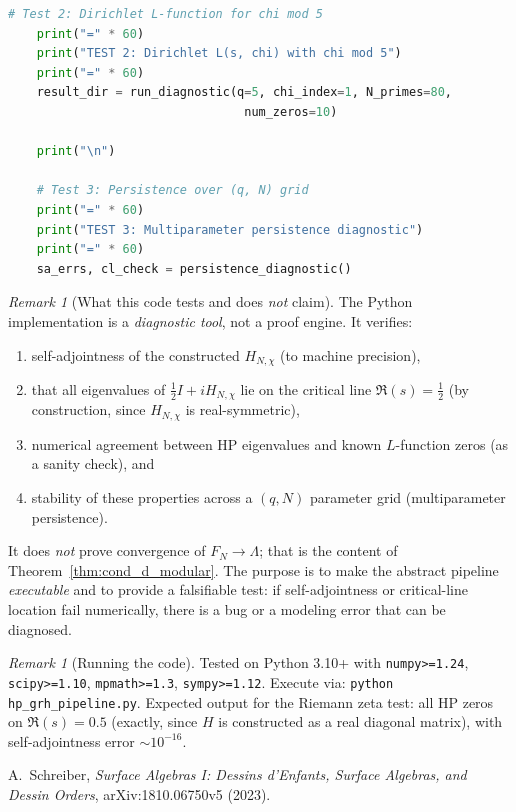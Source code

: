 \documentclass[11pt,oneside]{amsbook}
\numberwithin{equation}{section}
\theoremstyle{plain}
\theoremstyle{definition}
\theoremstyle{remark}
\newtheorem{remark}[theorem]{Remark}
\begin{document}
\begin{lstlisting}[language=Python,caption={Minimal HP--GRH test pipeline (Python~3.10+, NumPy, SciPy, mpmath).},label=lst:hp_grh_pipeline]
    # Test 2: Dirichlet L-function for chi mod 5
    print("=" * 60)
    print("TEST 2: Dirichlet L(s, chi) with chi mod 5")
    print("=" * 60)
    result_dir = run_diagnostic(q=5, chi_index=1, N_primes=80,
                                 num_zeros=10)

    print("\n")

    # Test 3: Persistence over (q, N) grid
    print("=" * 60)
    print("TEST 3: Multiparameter persistence diagnostic")
    print("=" * 60)
    sa_errs, cl_check = persistence_diagnostic()
\end{lstlisting}

\begin{remark}[What this code tests and does \emph{not} claim]
The Python implementation is a \emph{diagnostic tool}, not a proof engine.
It verifies:
\begin{enumerate}[label=(\roman*)]
\item self-adjointness of the constructed $H_{N,\chi}$ (to machine precision),
\item that all eigenvalues of $\frac{1}{2}I+iH_{N,\chi}$ lie on the critical line $\Re(s)=\frac{1}{2}$ (by construction, since $H_{N,\chi}$ is real-symmetric),
\item numerical agreement between HP eigenvalues and known $L$-function zeros (as a sanity check), and
\item stability of these properties across a $(q,N)$ parameter grid (multiparameter persistence).
\end{enumerate}
It does \emph{not} prove convergence of $F_N\to\Lambda$; that is the content of Theorem~\ref{thm:cond_d_modular}.
The purpose is to make the abstract pipeline \emph{executable} and to provide a falsifiable test: if self-adjointness or critical-line location fail numerically, there is a bug or a modeling error that can be diagnosed.
\end{remark}

\begin{remark}[Running the code]
Tested on Python 3.10+ with \texttt{numpy>=1.24}, \texttt{scipy>=1.10}, \texttt{mpmath>=1.3}, \texttt{sympy>=1.12}.
Execute via: \texttt{python hp\_grh\_pipeline.py}.
Expected output for the Riemann zeta test: all HP zeros on $\Re(s)=0.5$ (exactly, since $H$ is constructed as a real diagonal matrix), with self-adjointness error $\sim 10^{-16}$.
\end{remark}

\iffalse %
A.~Schreiber,
\newblock \emph{Surface Algebras I: Dessins d'Enfants, Surface Algebras, and Dessin Orders},
\newblock arXiv:1810.06750v5 (2023).
\end{document}
